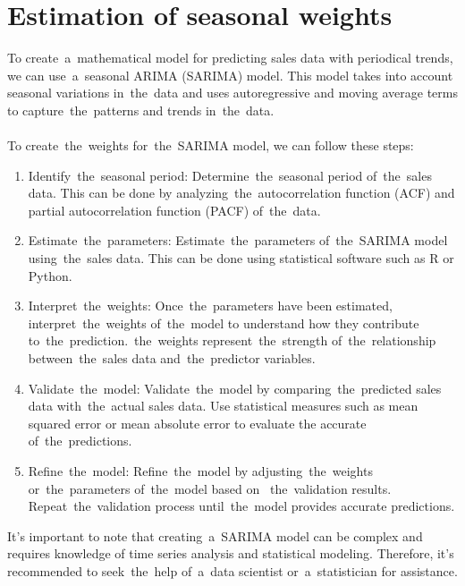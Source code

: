    \section{Estimation of seasonal weights}\label{sec:weights}
    To create~a~mathematical model for predicting sales data with periodical trends, we can use~a~seasonal
    ARIMA (SARIMA) model. This model takes into account seasonal variations in~the~data and uses autoregressive and
    moving average terms to capture~the~patterns and trends in~the~data.\\
    \\
    To create~the~weights for~the~SARIMA model, we can follow these steps:
    \begin{enumerate}
        \item Identify~the~seasonal period: Determine~the~seasonal period of~the~sales data. This can be done by
        analyzing~the~autocorrelation function (ACF) and partial autocorrelation function (PACF) of~the~data.
        \item Estimate~the~parameters: Estimate~the~parameters of~the~SARIMA model using~the~sales data.
        This can be done using statistical software such as R or Python.
        \item Interpret~the~weights: Once~the~parameters have been estimated, interpret~the~weights of~the~model
        to understand how they contribute to~the~prediction.~the~weights represent~the~strength of~the~relationship
        between~the~sales data and~the~predictor variables.
        \item Validate~the~model: Validate~the~model by comparing~the~predicted sales data with~the~actual sales data.
        Use statistical measures such as mean squared error or mean absolute error to evaluate the
        accurate of~the~predictions.
        \item Refine~the~model: Refine~the~model by adjusting~the~weights or~the~parameters of~the~model based on
       ~the~validation results. Repeat~the~validation process until~the~model provides accurate predictions.
    \end{enumerate}
    It's important to note that creating~a~SARIMA model can be complex and requires knowledge of time series
    analysis and statistical modeling. Therefore, it's recommended to seek~the~help of~a~data scientist
    or~a~statistician for assistance.
